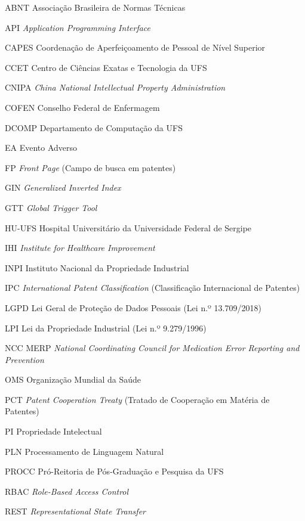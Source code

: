 \begin{siglas}
    \item[ABNT] Associação Brasileira de Normas Técnicas
    \item[API] \textit{Application Programming Interface}
    \item[CAPES] Coordenação de Aperfeiçoamento de Pessoal de Nível Superior
    \item[CCET] Centro de Ciências Exatas e Tecnologia da UFS
    \item[CNIPA] \textit{China National Intellectual Property Administration}
    \item[COFEN] Conselho Federal de Enfermagem
    \item[DCOMP] Departamento de Computação da UFS
    \item[EA] Evento Adverso
    \item[FP] \textit{Front Page} (Campo de busca em patentes)
    \item[GIN] \textit{Generalized Inverted Index}
    \item[GTT] \textit{Global Trigger Tool}
    \item[HU-UFS] Hospital Universitário da Universidade Federal de Sergipe
    \item[IHI] \textit{Institute for Healthcare Improvement}
    \item[INPI] Instituto Nacional da Propriedade Industrial
    \item[IPC] \textit{International Patent Classification} (Classificação Internacional de Patentes)
    \item[LGPD] Lei Geral de Proteção de Dados Pessoais (Lei n.º 13.709/2018)
    \item[LPI] Lei da Propriedade Industrial (Lei n.º 9.279/1996)
    \item[NCC MERP] \textit{National Coordinating Council for Medication Error Reporting and Prevention}
    \item[OMS] Organização Mundial da Saúde
    \item[PCT] \textit{Patent Cooperation Treaty} (Tratado de Cooperação em Matéria de Patentes)
    \item[PI] Propriedade Intelectual
    \item[PLN] Processamento de Linguagem Natural
    \item[PROCC] Pró-Reitoria de Pós-Graduação e Pesquisa da UFS
    \item[RBAC] \textit{Role-Based Access Control}
    \item[REST] \textit{Representational State Transfer}

\end{siglas}
